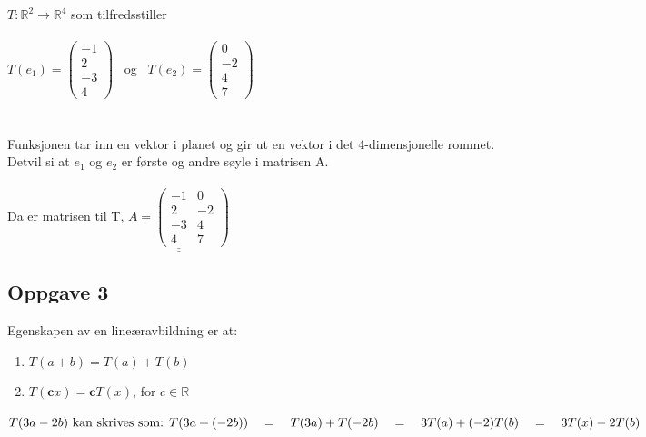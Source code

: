 \documentclass{article}
\begin{document}
\(T : \mathbb{R}^2 \rightarrow \mathbb{R}^4\) som tilfredsstiller\\ \\
\(T(e_1) = \begin{pmatrix}
    -1 \\ 2 \\ -3 \\ 4
\end{pmatrix}\) \ og \ \(T(e_2) = \begin{pmatrix}
    0 \\ -2 \\ 4 \\ 7
\end{pmatrix}\)
\\ \\ \\ 
Funksjonen tar inn en vektor i planet og gir ut en vektor i det 4-dimensjonelle rommet. \\ 
Detvil si at $e_1$ og $e_2$ er første og andre søyle i matrisen A.\\ \\
Da er matrisen til T, \quad \(\underline{\underline{A = 
\begin{pmatrix}
    -1 & 0 \\ 2 & -2 \\ -3 & 4 \\ 4 & 7
\end{pmatrix}}}\)

\newpage

\subsection*{Oppgave 3}

Egenskapen av en lineæravbildning er at:
\begin{enumerate}
    \item \(T(a+b) = T(a) + T(b)\)
    \item \(T(\textbf{c}x) = \textbf{c}T(x)\), for $c \in \mathbb{R}$
\end{enumerate}

\(T(3a-2b) \text{ kan skrives som: } \\\\ T(3a + (-2b)) \quad=\quad T(3a) + T(-2b) \quad=\quad 3T(a) + (-2)T(b) \quad=\quad 3T(x) - 2T(b)\)
\end{document}
